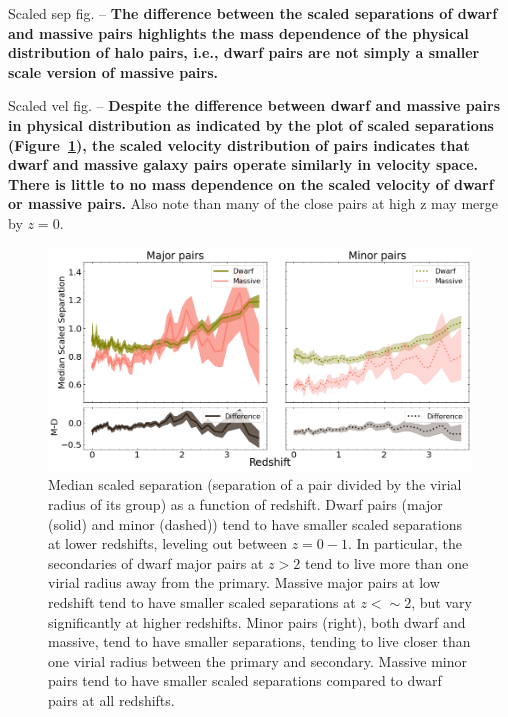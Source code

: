 \documentclass[twocolumn]{aastex631}
\begin{document}
Scaled sep fig. -- \textbf{The difference between the scaled separations of dwarf and massive pairs highlights the mass dependence of the physical distribution of halo pairs, i.e., dwarf pairs are not simply a smaller scale version of massive pairs.}

Scaled vel fig. --   \textbf{Despite the difference between dwarf and massive pairs in physical distribution as indicated by the plot of scaled separations (Figure~\ref{fig:sep-scaled}), the scaled velocity distribution of pairs indicates that dwarf and massive galaxy pairs operate similarly in velocity space. There is little to no mass dependence on the scaled velocity of dwarf or massive pairs.}
Also note than many of the close pairs at high z may merge by $z=0$.

\begin{figure}[htb]
  \centering
  \includegraphics[width=\textwidth]{scaledsep.png}
  \caption{Median scaled separation (separation of a pair divided by the virial radius of its group) as a function of redshift. Dwarf pairs (major (solid) and minor (dashed)) tend to have smaller scaled separations at lower redshifts, leveling out between $z=0-1$. In particular, the secondaries of dwarf major pairs at $z>2$ tend to live more than one virial radius away from the primary. Massive major pairs at low redshift tend to have smaller scaled separations  at $z<\sim2$, but vary significantly at higher redshifts. 
  Minor pairs (right), both dwarf and massive, tend to have smaller separations, tending to live closer than one virial radius between the primary and secondary. Massive minor pairs tend to have smaller scaled separations compared to dwarf pairs at all redshifts.
    }
  \label{fig:sep-scaled}
\end{figure}
\end{document}
